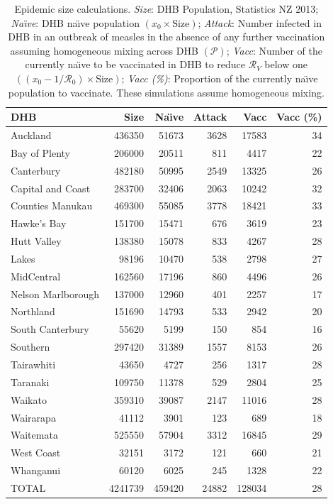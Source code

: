 \documentclass{article}
\newcommand{\Pe}{\mathcal{P}}
\newcommand{\Ro}{\mathcal{R}_0}
\newcommand{\Rr}{\mathcal{R}}
\begin{document}
\begin{table}[htdp]\small
\begin{center}
\begin{tabular}{lrrrrr}
\hline
DHB  & Size  & Na\"{\i}ve    &   Attack	& Vacc	& Vacc (\%)	\\
\hline

Auckland  &	436350 & 51673 & 3628 & 17583 & 34 \\
Bay of Plenty  &	206000 & 20511 & 811 & 4417 & 22 \\
Canterbury  &	482180 & 50995 & 2549 & 13325 & 26 \\
Capital and Coast  &	283700 & 32406 & 2063 & 10242 & 32 \\
Counties Manukau  &	469300 & 55085 & 3778 & 18421 & 33 \\
Hawke's Bay  &	151700 & 15471 & 676 & 3619 & 23 \\
Hutt Valley  &	138380 & 15078 & 833 & 4267 & 28 \\
Lakes  &	98196 & 10470 & 538 & 2798 & 27 \\
MidCentral  &	162560 & 17196 & 860 & 4496 & 26 \\
Nelson Marlborough  &	137000 & 12960 & 401 & 2257 & 17 \\
Northland  &	151690 & 14793 & 533 & 2942 & 20 \\
South Canterbury  &	55620 & 5199 & 150 & 854 & 16 \\
Southern  &	297420 & 31389 & 1557 & 8153 & 26 \\
Tairawhiti &  43650 & 4727 & 256 & 1317 & 28 \\
Taranaki  &	109750 & 11378 & 529 & 2804 & 25 \\
Waikato  &	359310 & 39087 & 2147 & 11016 & 28 \\
Wairarapa  &	41112 & 3901 & 123 & 689 & 18 \\
Waitemata  & 525550 & 57904 & 3312 & 16845 & 29 \\
West Coast  &	32151 & 3172 & 121 & 660 & 21 \\
Whanganui & 60120 & 6025 & 245 & 1328 & 22 \\

\hline			
TOTAL   & 		4241739   & 		459420   & 		24882   & 		128034 & 28\\
\hline
\end{tabular}
\end{center}
\caption{Epidemic size calculations. \textit{Size}: DHB Population, Statistics NZ 2013;		
\textit{Na\"{\i}ve}:		DHB na\"{\i}ve population $\left(x_0\times\text{Size}\right)$;		
\textit{Attack}:		Number infected in DHB in an outbreak of measles in the absence of any further vaccination assuming homogeneous mixing across DHB $\left(\Pe\right)$;	
\textit{Vacc}:		Number of the currently na\"{\i}ve to be vaccinated in DHB to reduce $\Rr_V$ below one  $\left(\left(x_0-1/\Ro\right)\times\text{Size}\right)$; \textit{Vacc (\%)}: Proportion of the currently na\"{\i}ve population to vaccinate. These simulations assume homogeneous mixing.			
}
\label{table:attack}
\end{table}%
\end{document}
